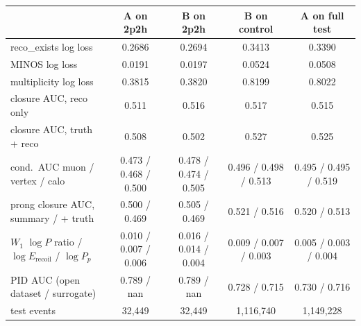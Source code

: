 \begin{tabular}{lcccc}
\toprule
 & A on 2p2h & B on 2p2h & B on control & A on full test \\
\midrule
reco\_exists log loss & 0.2686 & 0.2694 & 0.3413 & 0.3390 \\
MINOS log loss & 0.0191 & 0.0197 & 0.0524 & 0.0508 \\
multiplicity log loss & 0.3815 & 0.3820 & 0.8199 & 0.8022 \\
closure AUC, reco only & 0.511 & 0.516 & 0.517 & 0.515 \\
closure AUC, truth + reco & 0.508 & 0.502 & 0.527 & 0.525 \\
cond.\ AUC muon / vertex / calo & 0.473 / 0.468 / 0.500 & 0.478 / 0.474 / 0.505 & 0.496 / 0.498 / 0.513 & 0.495 / 0.495 / 0.519 \\
prong closure AUC, summary / + truth & 0.500 / 0.469 & 0.505 / 0.469 & 0.521 / 0.516 & 0.520 / 0.513 \\
$W_1$ $\log P$ ratio / $\log E_\mathrm{recoil}$ / $\log P_p$ & 0.010 / 0.007 / 0.006 & 0.016 / 0.014 / 0.004 & 0.009 / 0.007 / 0.003 & 0.005 / 0.003 / 0.004 \\
PID AUC (open dataset / surrogate) & 0.789 / nan & 0.789 / nan & 0.728 / 0.715 & 0.730 / 0.716 \\
test events & 32,449 & 32,449 & 1,116,740 & 1,149,228 \\
\bottomrule
\end{tabular}
